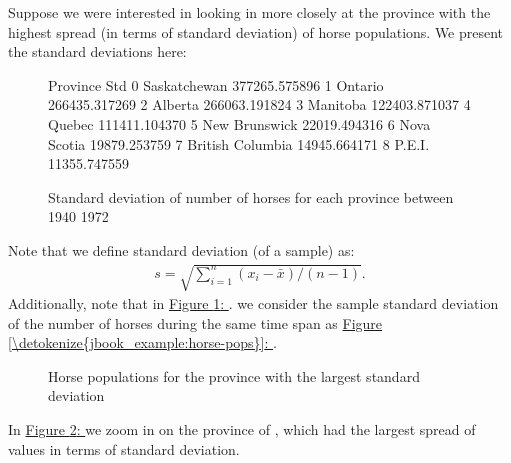 \documentclass[letterpaper,10pt,english]{jupyterBook}
\let\sphinxpxdimen\pdfpxdimen\else\newdimen\sphinxpxdimen
\begin{document}
\sphinxAtStartPar
Suppose we were interested in looking in more closely at the
province with the highest spread (in terms of standard deviation)
of horse populations. We present the standard deviations here:

\begin{figure}[htbp]
\centering
\capstart

\begin{sphinxVerbatim}[commandchars=\\\{\}]
           Province            Std
0      Saskatchewan  377265.575896
1           Ontario  266435.317269
2           Alberta  266063.191824
3          Manitoba  122403.871037
4            Quebec  111411.104370
5     New Brunswick   22019.494316
6       Nova Scotia   19879.253759
7  British Columbia   14945.664171
8            P.E.I.   11355.747559
\end{sphinxVerbatim}
\caption{Standard deviation of number of horses for each province between 1940 \sphinxhyphen{} 1972}\label{\detokenize{jbook_example:horses-tbl-fig}}\end{figure}

\sphinxAtStartPar
Note that we define standard deviation (of a sample) as:
\begin{equation*}
\begin{split}s = \sqrt{\sum_{i = 1}^n(x_i - \bar{x}) / (n-1)}.\end{split}
\end{equation*}
\sphinxAtStartPar
Additionally, note that in \hyperref[\detokenize{jbook_example:horses-tbl-fig}]{Figure \ref{\detokenize{jbook_example:horses-tbl-fig}}: }. we
consider the sample standard deviation of the number of horses
during the same time span as \hyperref[\detokenize{jbook_example:horse-pops}]{Figure \ref{\detokenize{jbook_example:horse-pops}}: }.

\begin{figure}[htbp]
\centering
\capstart

\noindent\sphinxincludegraphics[width=500\sphinxpxdimen]{{horse_pop_plot_largest_sd}.png}
\caption{Horse populations for the province with the largest standard deviation}\label{\detokenize{jbook_example:large-sd}}\end{figure}

\sphinxAtStartPar
In \hyperref[\detokenize{jbook_example:large-sd}]{Figure \ref{\detokenize{jbook_example:large-sd}}: } we zoom in
on the province of , which had the largest spread of values in
terms of standard deviation.
\end{document}
